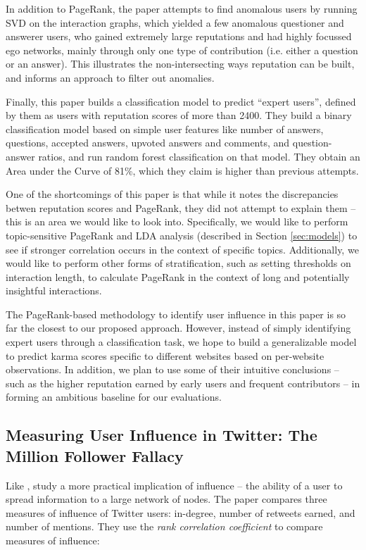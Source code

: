 \documentclass[10pt]{article}
\begin{document}
In addition to PageRank, the paper attempts to find anomalous users by running
SVD on the interaction graphs, which yielded a few anomalous questioner and
answerer users, who gained extremely large reputations and had highly focussed
ego networks, mainly through only one type of contribution (i.e. either a
question or an answer). This illustrates the non-intersecting ways reputation
can be built, and informs an approach to filter out anomalies.

Finally, this paper builds a classification model to predict ``expert users'',
defined by them as users with reputation scores of more than 2400. They build a
binary classification model based on simple user features like number of answers,
questions, accepted answers, upvoted answers and comments, and question-answer
ratios, and run random forest classification on that model. They obtain an Area
under the Curve of 81\%, which they claim is higher than previous attempts.

One of the shortcomings of this paper is that while it notes the discrepancies
betwen reputation scores and PageRank, they did not attempt to explain them --
this is an area we would like to look into. Specifically, we would like to
perform topic-sensitive PageRank and LDA analysis (described in Section
\ref{sec:models}) to see if stronger correlation occurs in the context of
specific topics.  Additionally, we would like to perform other forms of
stratification, such as setting thresholds on interaction length, to calculate
PageRank in the context of long and potentially insightful interactions.

The PageRank-based methodology to identify user influence in this paper is so
far the closest to our proposed approach. However, instead of simply identifying
expert users through a classification task, we hope to build a generalizable
model to predict karma scores specific to different websites based on
per-website observations.  In addition, we plan to use some of their intuitive
conclusions -- such as the higher reputation earned by early users and frequent
contributors -- in forming an ambitious baseline for our evaluations.

\subsection{Measuring User Influence in Twitter: The Million Follower Fallacy
  \citep{cha2010measuring}}

Like \cite{bakshy2011everyone}, \citet{cha2010measuring} study a more practical
implication of influence -- the ability of a user to spread information to a
large network of nodes. The paper compares three measures of influence of
Twitter users: in-degree, number of retweets earned, and number of mentions.
They use the \textit{rank correlation coefficient} to compare measures of
influence:
\end{document}
